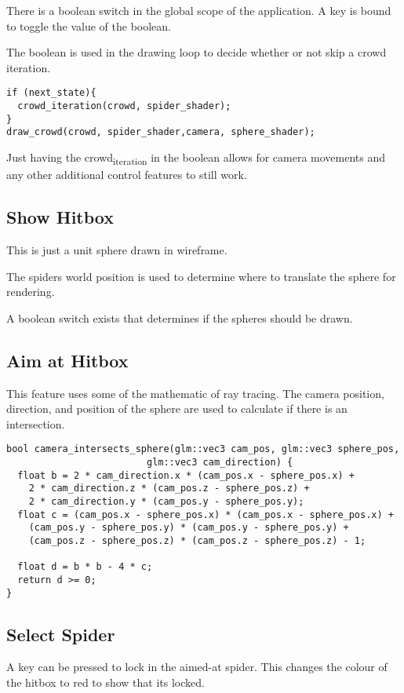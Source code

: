 \documentclass[11pt]{article}
\begin{document}
There is a boolean switch in the global scope of the application. A key is bound to toggle the value of the boolean.   

The boolean is used in the drawing loop to decide whether or not skip a crowd iteration.
\begin{verbatim}
if (next_state){
  crowd_iteration(crowd, spider_shader);
}
draw_crowd(crowd, spider_shader,camera, sphere_shader);
\end{verbatim}
Just having the crowd\textsubscript{iteration} in the boolean allows for camera movements and any other additional control features
to still work.

\subsection*{Show Hitbox}
\label{sec:org487720b}
This is just a unit sphere drawn in wireframe.   

The spiders world position is used to determine where to translate the sphere for rendering.   

A boolean switch exists that determines if the spheres should be drawn.
\subsection*{Aim at Hitbox}
\label{sec:org56948be}
This feature uses some of the mathematic of ray tracing.  
The camera position, direction, and position of the sphere are used to calculate if there is an intersection.
\begin{verbatim}
bool camera_intersects_sphere(glm::vec3 cam_pos, glm::vec3 sphere_pos, 
						 glm::vec3 cam_direction) {
  float b = 2 * cam_direction.x * (cam_pos.x - sphere_pos.x) +
    2 * cam_direction.z * (cam_pos.z - sphere_pos.z) +
    2 * cam_direction.y * (cam_pos.y - sphere_pos.y);
  float c = (cam_pos.x - sphere_pos.x) * (cam_pos.x - sphere_pos.x) +
    (cam_pos.y - sphere_pos.y) * (cam_pos.y - sphere_pos.y) +
    (cam_pos.z - sphere_pos.z) * (cam_pos.z - sphere_pos.z) - 1;

  float d = b * b - 4 * c;
  return d >= 0;
}
\end{verbatim}
\subsection*{Select Spider}
\label{sec:org3b2ba24}
A key can be pressed to lock in the aimed-at spider. This changes the colour of the hitbox to red to show 
that its locked.
\end{document}
